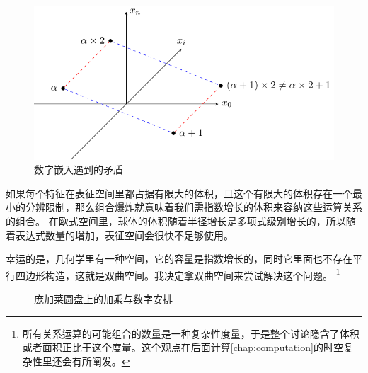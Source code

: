 \documentclass[a4paper,12pt]{book}
\numberwithin{problem}{section}
\numberwithin{definition}{section}
\numberwithin{lemma}{section}
\numberwithin{proposition}{section}
\numberwithin{theorem}{section}
\numberwithin{grammar}{section}
\numberwithin{program}{section}
\numberwithin{convention}{section}
\numberwithin{corollary}{section}
\begin{document}
\begin{figure}
\centering
\includegraphics{../images/numberembedding}
\caption{数字嵌入遇到的矛盾}
\end{figure}

如果每个特征在表征空间里都占据有限大的体积，且这个有限大的体积存在一个最小的分辨限制，那么组合爆炸就意味着我们需指数增长的体积来容纳这些运算关系的组合。
在欧式空间里，球体的体积随着半径增长是多项式级别增长的，所以随着表达式数量的增加，表征空间会很快不足够使用。

幸运的是，几何学里有一种空间，它的容量是指数增长的，同时它里面也不存在平行四边形构造，这就是双曲空间。我决定拿双曲空间来尝试解决这个问题。
\footnote{所有关系运算的可能组合的数量是一种复杂性度量，于是整个讨论隐含了体积或者面积正比于这个度量。这个观点在后面计算\ref{chap:computation}的时空复杂性里还会有所阐发。}

\begin{figure}[ht]\centering
{}
\caption{庞加莱圆盘上的加乘与数字安排}\label{fig:assignment2}
\end{figure}
\end{document}
